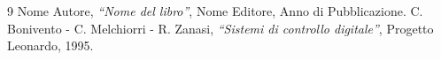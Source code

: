 \documentclass[a4paper, 12pt]{report}
\numberwithin{equation}{section}
\begin{document}











\listoffigures


\begin{thebibliography}{9}
        Nome Autore,
            \emph{``Nome del libro''},
          Nome Editore, Anno di Pubblicazione.
        C. Bonivento - C. Melchiorri - R. Zanasi,
            \emph{``Sistemi di controllo digitale''},
          Progetto Leonardo, 1995.
\end{thebibliography}
\end{document}
